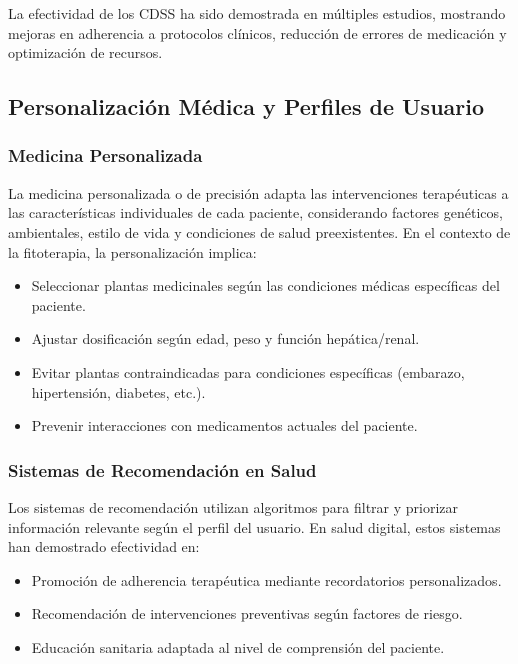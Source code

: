 \documentclass[12pt,a4paper]{article}
\begin{document}
La efectividad de los CDSS ha sido demostrada en múltiples estudios, mostrando mejoras en adherencia a protocolos clínicos, reducción de errores de medicación y optimización de recursos\cite{Bright2012}.

\subsection{Personalización Médica y Perfiles de Usuario}

\subsubsection{Medicina Personalizada}

La medicina personalizada o de precisión adapta las intervenciones terapéuticas a las características individuales de cada paciente, considerando factores genéticos, ambientales, estilo de vida y condiciones de salud preexistentes\cite{Collins2015}. En el contexto de la fitoterapia, la personalización implica:

\begin{itemize}
    \item Seleccionar plantas medicinales según las condiciones médicas específicas del paciente.
    \item Ajustar dosificación según edad, peso y función hepática/renal.
    \item Evitar plantas contraindicadas para condiciones específicas (embarazo, hipertensión, diabetes, etc.).
    \item Prevenir interacciones con medicamentos actuales del paciente.
\end{itemize}

\subsubsection{Sistemas de Recomendación en Salud}

Los sistemas de recomendación utilizan algoritmos para filtrar y priorizar información relevante según el perfil del usuario\cite{Ricci2015}. En salud digital, estos sistemas han demostrado efectividad en:

\begin{itemize}
    \item Promoción de adherencia terapéutica mediante recordatorios personalizados\cite{Park2014}.
    \item Recomendación de intervenciones preventivas según factores de riesgo\cite{Kravitz2013}.
    \item Educación sanitaria adaptada al nivel de comprensión del paciente\cite{Paasche2016}.
\end{itemize}
\end{document}
